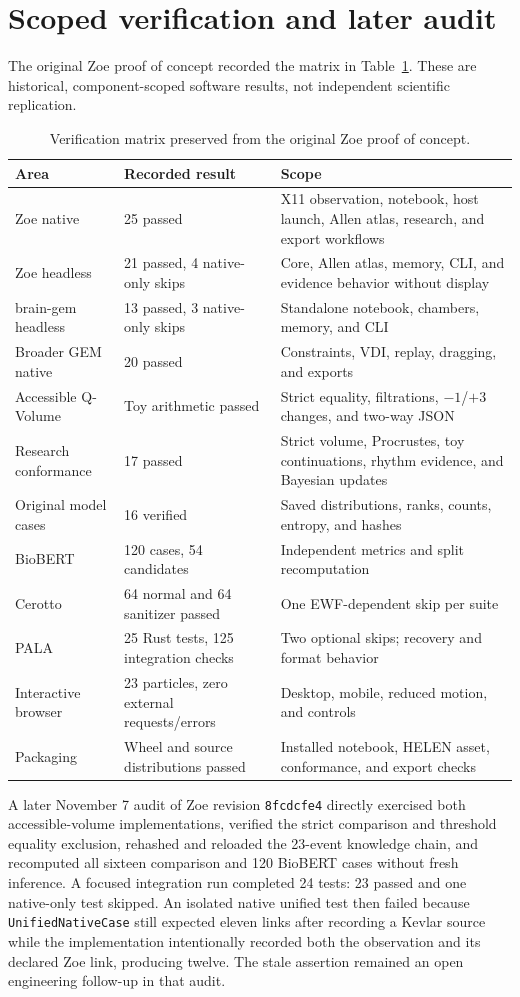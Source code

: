 \section{Scoped verification and later audit}
The original Zoe proof of concept recorded the matrix in Table~\ref{tab:zoe-verification}. These are historical, component-scoped software results, not independent scientific replication.
\begin{table}[htbp]
\centering
\caption{Verification matrix preserved from the original Zoe proof of concept.}
\label{tab:zoe-verification}
{\scriptsize
\begin{tabularx}{\textwidth}{p{3.7cm}p{3.3cm}X}
\toprule
Area&Recorded result&Scope\\
\midrule
Zoe native&25 passed&X11 observation, notebook, host launch, Allen atlas, research, and export workflows\\
Zoe headless&21 passed, 4 native-only skips&Core, Allen atlas, memory, CLI, and evidence behavior without display\\
brain-gem headless&13 passed, 3 native-only skips&Standalone notebook, chambers, memory, and CLI\\
Broader GEM native&20 passed&Constraints, VDI, replay, dragging, and exports\\
Accessible Q-Volume&Toy arithmetic passed&Strict equality, filtrations, $-1$/$+3$ changes, and two-way JSON\\
Research conformance&17 passed&Strict volume, Procrustes, toy continuations, rhythm evidence, and Bayesian updates\\
Original model cases&16 verified&Saved distributions, ranks, counts, entropy, and hashes\\
BioBERT&120 cases, 54 candidates&Independent metrics and split recomputation\\
Cerotto&64 normal and 64 sanitizer passed&One EWF-dependent skip per suite\\
PALA&25 Rust tests, 125 integration checks&Two optional skips; recovery and format behavior\\
Interactive browser&23 particles, zero external requests/errors&Desktop, mobile, reduced motion, and controls\\
Packaging&Wheel and source distributions passed&Installed notebook, HELEN asset, conformance, and export checks\\
\bottomrule
\end{tabularx}}
\end{table}

A later November 7 audit of Zoe revision \texttt{8fcdcfe4} directly exercised both accessible-volume implementations, verified the strict comparison and threshold equality exclusion, rehashed and reloaded the 23-event knowledge chain, and recomputed all sixteen comparison and 120 BioBERT cases without fresh inference. A focused integration run completed 24 tests: 23 passed and one native-only test skipped. An isolated native unified test then failed because \texttt{UnifiedNativeCase} still expected eleven links after recording a Kevlar source while the implementation intentionally recorded both the observation and its declared Zoe link, producing twelve. The stale assertion remained an open engineering follow-up in that audit.

